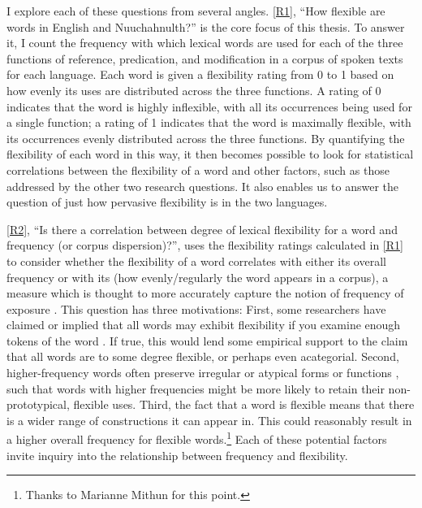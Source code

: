I explore each of these questions from several angles. \ref{R1}, \enquote{How flexible are words in English and Nuuchahnulth?} is the core focus of this thesis. To answer it, I count the frequency with which lexical words are used for each of the three functions of reference, predication, and modification in a corpus of spoken texts for each language. Each word is given a flexibility rating from 0 to 1 based on how evenly its uses are distributed across the three functions. A rating of 0 indicates that the word is highly inflexible, with all its occurrences being used for a single function; a rating of 1 indicates that the word is maximally flexible, with its occurrences evenly distributed across the three functions. By quantifying the flexibility of each word in this way, it then becomes possible to look for statistical correlations between the flexibility of a word and other factors, such as those addressed by the other two research questions. It also enables us to answer the question of just how pervasive flexibility is in the two languages.

\ref{R2}, \enquote{Is there a correlation between degree of lexical flexibility for a word and frequency (or corpus dispersion)?}, uses the flexibility ratings calculated in \ref{R1} to consider whether the flexibility of a word correlates with either its overall frequency or with its  (how evenly/regularly the word appears in a corpus), a measure which is thought to more accurately capture the notion of frequency of exposure \parencites{Gries2008}{Griesforthcoming}. This question has three motivations: First, some researchers have claimed or implied that all words may exhibit flexibility if you examine enough tokens of the word \parencite[77]{MoselHovdhaugen1992}. If true, this would lend some empirical support to the claim that all words are to some degree flexible, or perhaps even acategorial. Second, higher-frequency words often preserve irregular or atypical forms or functions \parencite[Ch.~13]{Bybee2007}, such that words with higher frequencies might be more likely to retain their non-prototypical, flexible uses. Third, the fact that a word is flexible means that there is a wider range of constructions it can appear in. This could reasonably result in a higher overall frequency for flexible words.\footnote{Thanks to Marianne Mithun for this point.} Each of these potential factors invite inquiry into the relationship between frequency and flexibility.

